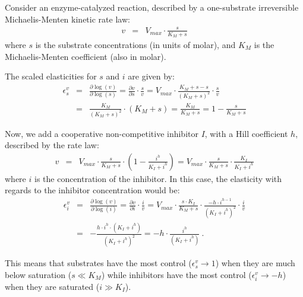 \documentclass[12pt,a4paper]{article}
\begin{document}
Consider an enzyme-catalyzed reaction, described by a one-substrate irreversible Michaelis-Menten kinetic rate law:
\begin{eqnarray}
    v &=& V_{max} \cdot \frac{s}{K_M + s}
\end{eqnarray}
where $s$ is the substrate concentrations (in units of molar), and $K_M$ is the Michaelis-Menten coefficient (also in molar).

The scaled elasticities for $s$ and $i$ are given by:
\begin{eqnarray}
    \epsilon_s^v &=& \frac{\partial \log(v)}{\partial \log(s)} = \frac{\partial v}{\partial s}\cdot\frac{s}{v} = V_{max} \cdot \frac{K_M + s - s}{(K_M + s)^2} \cdot \frac{s}{v} \nonumber \\
    &=& \frac{K_M}{(K_M + s)^2} \cdot (K_M + s) = \frac{K_M}{K_M + s} = 1 - \frac{s}{K_M + s}
\end{eqnarray}

Now, we add a cooperative non-competitive inhibitor $I$, with a Hill coefficient $h$, described by the rate law:
\begin{eqnarray}
    v &=& V_{max} \cdot \frac{s}{K_M + s} \cdot \left(1 - \frac{i^h}{K_I + i^h}\right) =
    V_{max} \cdot \frac{s}{K_M + s} \cdot \frac{K_I}{K_I + i^h}
\end{eqnarray}
where $i$ is the concentration of the inhibitor.
In this case, the elasticity with regards to the inhibitor concentration would be:
\begin{eqnarray}
    \epsilon_i^v &=& \frac{\partial \log(v)}{\partial \log(i)} = \frac{\partial v}{\partial i}\cdot\frac{i}{v} = V_{max} \cdot \frac{s \cdot K_I}{K_M + s} \cdot \frac{- h \cdot i^{h-1}}{(K_I + i^h)^2} \cdot \frac{i}{v} \nonumber \\
    &=& -\frac{h \cdot i^h \cdot (K_I + i^h)}{(K_I + i^h)^2} = -h \cdot \frac{i^h}{(K_I + i^h)}~.
\end{eqnarray}

This means that substrates have the most control ($\epsilon_s^v \rightarrow 1$) when they are much below saturation ($s \ll K_M$) while inhibitors have the most control ($\epsilon_i^v \rightarrow -h$) when they are saturated ($i \gg K_I$).
\end{document}
